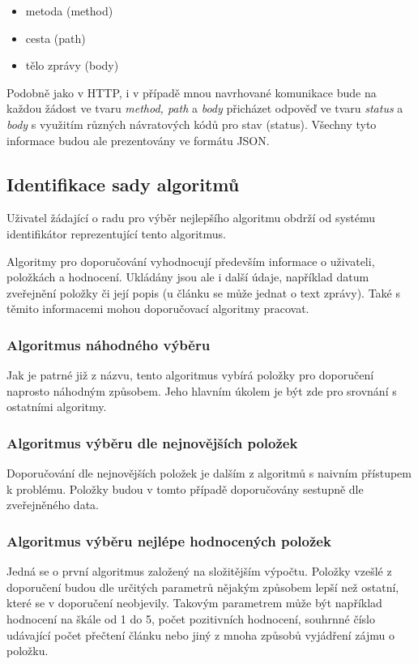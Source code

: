 \documentclass[thesis=M,czech]{FITthesis}[2014/05/07]
\begin{document}
\begin{itemize}
	\item metoda (method)
	\item cesta (path)
	\item tělo zprávy (body)
\end{itemize}

Podobně jako v HTTP, i v případě mnou navrhované komunikace bude na každou žádost ve tvaru \emph{method, path} a \emph{body} přicházet odpověď ve tvaru \emph{status} a \emph{body} s využitím různých návratových kódů pro stav (status). Všechny tyto informace budou ale prezentovány ve formátu JSON.
			
\subsection{Identifikace sady algoritmů}
Uživatel žádající o radu pro výběr nejlepšího algoritmu obdrží od systému identifikátor reprezentující tento algoritmus. 

Algoritmy pro doporučování vyhodnocují především informace o uživateli, položkách a hodnocení. Ukládány jsou ale i další údaje, například datum zveřejnění položky či její popis (u článku se může jednat o text zprávy). Také s těmito informacemi mohou doporučovací algoritmy pracovat. 

\subsubsection{Algoritmus náhodného výběru}

Jak je patrné již z názvu, tento algoritmus vybírá položky pro doporučení naprosto náhodným způsobem. Jeho hlavním úkolem je být zde pro srovnání s ostatními algoritmy. 

\subsubsection{Algoritmus výběru dle nejnovějších položek}

Doporučování dle nejnovějších položek je dalším z algoritmů s naivním přístupem k problému. Položky budou v tomto případě doporučovány sestupně dle zveřejněného data. 

\subsubsection{Algoritmus výběru nejlépe hodnocených položek}

Jedná se o první algoritmus založený na složitějším výpočtu. Položky vzešlé z doporučení budou dle určitých parametrů nějakým způsobem lepší než ostatní, které se v doporučení neobjevily. Takovým parametrem může být například hodnocení na škále od 1 do 5, počet pozitivních hodnocení, souhrnné číslo udávající počet přečtení článku nebo jiný z mnoha způsobů vyjádření zájmu o položku. 
\end{document}
